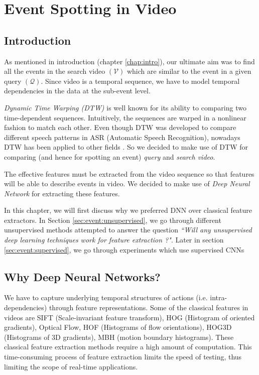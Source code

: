 \chapter{Event Spotting in Video}
\label{chap:event}

\section{Introduction}
As mentioned in introduction (chapter \ref{chap:intro}), our ultimate aim was to find all the events in the search video $(\mathcal{V})$ which are similar to the event in a given query $(\mathcal{Q})$.  Since video is a temporal sequence, we have to model temporal dependencies in the data at the sub-event level.

\textit{Dynamic Time Warping (DTW)} is well known for its ability to comparing two time-dependent sequences.  Intuitively, the sequences are warped in a nonlinear fashion to match each other.  Even though DTW was developed to compare different speech patterns in ASR (Automatic Speech Recognition), nowadays DTW has been applied to other fields \cite{muller2007information}.  So we decided to make use of DTW for comparing (and hence for spotting an event) \textit{query} and \textit{search video}.

The effective features must be extracted from the video sequence so that features will be able to describe events in video.  We decided to make use of \textit{Deep Neural Network} for extracting these features.

In this chapter, we will first discuss why we preferred  DNN over classical feature extractors.  In Section \ref{sec:event:unsupervised}, we go through different unsupervised methods attempted to answer the question \textit{``Will any unsupervised deep learning techniques work for feature extraction ?"}.  Later in section \ref{sec:event:supervised}, we go through experiments which use supervised CNNs  

\section{Why Deep Neural Networks?}
\label{sec:event:why}
We have to capture underlying temporal structures of actions (i.e.  intra-dependencies) through feature representations.  Some of the classical features in videos are SIFT (Scale-invariant feature transform), HOG (Histogram of oriented gradients), Optical Flow, HOF (Histograms of flow orientations), HOG3D (Histograms of 3D gradients), MBH (motion boundary histograms).  These classical feature extraction methods require a high amount of computation\cite{baker2011database,chatfield2011devil}.  This time-consuming process of feature extraction limits the speed of testing, thus limiting the scope of real-time applications.

